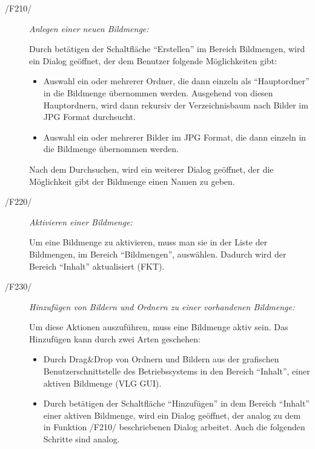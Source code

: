	\begin{description}
		
		\item[/F210/] \textit{Anlegen einer neuen Bildmenge:}\par Durch betätigen der Schaltfläche "`Erstellen"' im Bereich Bildmengen, wird ein Dialog geöffnet, der dem Benutzer folgende Möglichkeiten gibt:
			
			\begin{itemize}
			
				\item Auswahl ein oder mehrerer Ordner, die dann einzeln als "`Hauptordner"' in die Bildmenge übernommen werden. Ausgehend von diesen Hauptordnern, wird dann rekursiv der Verzeichnisbaum nach Bilder im JPG Format durchsucht.
				
				\item Auswahl ein oder mehrerer Bilder im JPG Format, die dann einzeln in die Bildmenge übernommen werden.
			
			\end{itemize}
		
		Nach dem Durchsuchen, wird ein weiterer Dialog geöffnet, der die Möglichkeit gibt der Bildmenge einen Namen zu geben.
		
		\item[/F220/] \textit{Aktivieren einer Bildmenge:}\par Um eine Bildmenge zu aktivieren, muss man sie in der Liste der Bildmengen, im Bereich "`Bildmengen"', auswählen. Dadurch wird der Bereich "`Inhalt"' aktualisiert (FKT).
		
		\item[/F230/] \textit{Hinzufügen von Bildern und Ordnern zu einer vorhandenen Bildmenge:}\par Um diese Aktionen auszuführen, muss eine Bildmenge aktiv sein. Das Hinzufügen kann durch zwei Arten geschehen:
		
			\begin{itemize}
			
				\item Durch Drag\&Drop von Ordnern und Bildern aus der grafischen Benutzerschnittstelle des Betriebssystems in den Bereich "`Inhalt"', einer aktiven Bildmenge (VLG GUI). 
				
				\item Durch betätigen der Schaltfläche "`Hinzufügen"' in dem Bereich "`Inhalt"' einer aktiven Bildmenge, wird ein Dialog geöffnet, der analog zu dem in Funktion /F210/ beschriebenen Dialog arbeitet. Auch die folgenden Schritte sind analog.
			

\end{itemize}
\end{description}
